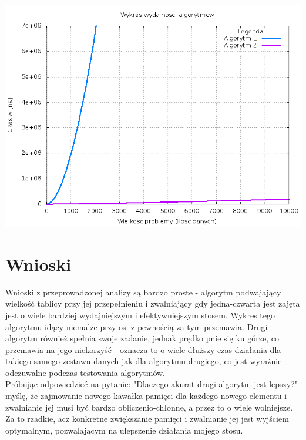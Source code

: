 \documentclass[a4paper,12pt]{article}
\begin{document}
\begin{center}
\includegraphics[scale=0.4]{Eksperyment-2.png}
\end{center}

\section{Wnioski}

Wnioski z przeprowadzonej analizy są bardzo proste - algorytm podwajający wielkość
tablicy przy jej przepełnieniu i zwalniający gdy jedna-czwarta jest zajęta
jest o wiele bardziej wydajniejszym i efektywniejszym stosem. Wykres tego algorytmu 
idący niemalże przy osi z pewnością za tym przemawia. Drugi algorytm również
spełnia swoje zadanie, jednak prędko pnie się ku górze, co przemawia na jego 
niekorzyść - oznacza to o wiele dłuższy czas działania dla takiego samego zestawu
danych jak dla algorytmu drugiego, co jest wyraźnie odczuwalne podczas testowania
algorytmów.\\


Próbując odpowiedzieć na pytanie: "Dlaczego akurat drugi algorytm jest lepszy?"
myślę, że zajmowanie nowego kawałka pamięci dla każdego nowego elementu i
zwalnianie jej musi być bardzo obliczenio-chłonne, a przez to o wiele wolniejsze.
Za to rzadkie, acz konkretne zwiększanie pamięci i zwalnianie jej jest wyjściem
optymalnym, pozwalającym na ulepszenie działania mojego stosu.\\\\
\end{document}
